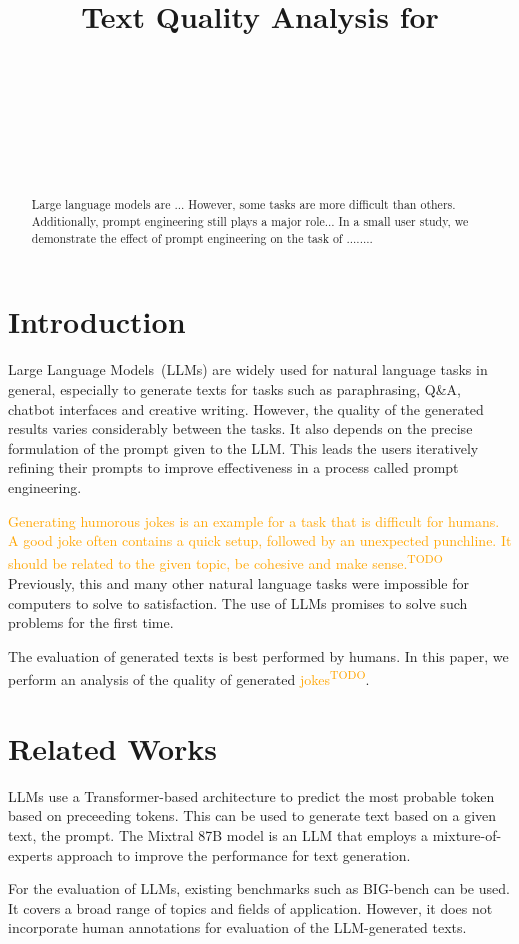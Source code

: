 \documentclass[11pt]{article}
\title{Text Quality Analysis for \todo{LLM-Generated Humor}}
\author{\todo{First Author}\\
  \todo{School (optional)} \\
  \todo{E-Mail (optional)} \\\And
  \todo{Second Author} \\
  \todo{School (optional)} \\
  \todo{E-Mail (optional)} \\
}
\newcommand{\todo}[1]{\textcolor{orange}{#1\textsuperscript{\footnotesize TODO}}}
\begin{document}
\maketitle
\begin{abstract}
Large language models are ...
However, some tasks are more difficult than others. Additionally, prompt engineering still plays a major role...
In a small user study, we demonstrate the effect of prompt engineering on the task of ........
\end{abstract}

\section{Introduction}

Large Language Models~(LLMs) are widely used for natural language tasks in general, especially to generate texts for tasks such as paraphrasing, Q\&A, chatbot interfaces and creative writing. However, the quality of the generated results varies considerably between the tasks. It also depends on the precise formulation of the prompt given to the LLM. This leads the users iteratively refining their prompts to improve effectiveness in a process called prompt engineering.

\todo{Generating humorous jokes is an example for a task that is difficult for humans. A good joke often contains a quick setup, followed by an unexpected punchline. It should be related to the given topic, be cohesive and make sense.} Previously, this and many other natural language tasks were impossible for computers to solve to satisfaction. The use of LLMs promises to solve such problems for the first time.

The evaluation of generated texts is best performed by humans. In this paper, we perform an analysis of the quality of generated \todo{jokes}.

\section{Related Works}

LLMs use a Transformer-based architecture \cite{vaswani2017} to predict the most probable token based on preceeding tokens. This can be used to generate text based on a given text, the prompt.
The Mixtral 8\texttimes 7B model \cite{jiang2024} is an LLM that employs a mixture-of-experts approach to improve the performance for text generation.

For the evaluation of LLMs, existing benchmarks such as BIG-bench \cite{srivastava2023} can be used. It covers a broad range of topics and fields of application. However, it does not incorporate human annotations for evaluation of the LLM-generated texts.
\end{document}
